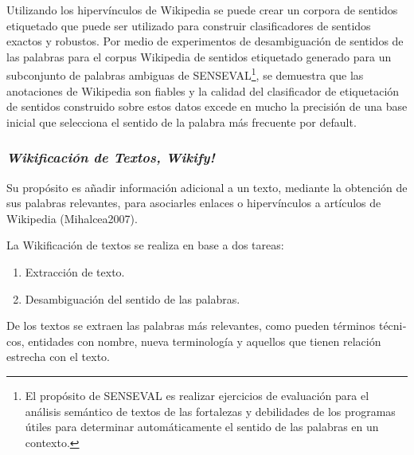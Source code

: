\documentclass[letterpaper]{article}
\newcommand\textstylebibuscitbase[1]{#1}
\newcommand\liststyleLxii{%
\renewcommand\theenumi{\arabic{enumi}}
\renewcommand\theenumii{\arabic{enumii}}
\renewcommand\theenumiii{\arabic{enumiii}}
\renewcommand\theenumiv{\arabic{enumiv}}
\renewcommand\labelenumi{\theenumi.}
\renewcommand\labelenumii{\theenumii.}
\renewcommand\labelenumiii{\theenumiii.}
\renewcommand\labelenumiv{\theenumiv.}
}
\begin{document}
\bigskip

{\sffamily
Utilizando \textstylebibuscitbase{los hiperv\'inculos de Wikipedia se
puede crear un corpora de sentidos etiquetado que puede ser utilizado
para construir clasificadores de sentidos
}\textstylebibuscitbase{exactos y robustos. Por medio de experimentos
de desambiguaci\'on de sentidos }\textstylebibuscitbase{de las palabras
para el corpus Wikipedia de sentidos etiquetado generado para un
subconjunto de palabras ambiguas de SENSEVAL}\footnote{El prop\'osito
de SENSEVAL es realizar ejercicios de evaluaci\'on para el an\'alisis
sem\'antico de textos de las fortalezas y debilidades de los programas
\'utiles para determinar autom\'aticamente el sentido de las palabras
en un contexto.}\textstylebibuscitbase{, se demuestra que las
anotaciones de Wikipedia son fiables}\textstylebibuscitbase{ y la
calidad del clasificador de etiquetaci\'on de sentidos construido sobre
estos datos excede en mucho la precisi\'on de una base inicial }%
\textstylebibuscitbase{que selecciona el sentido de la palabra m\'as
}\textstylebibuscitbase{frecuente por default.}}


\bigskip

\subsubsection[Wikificaci\'on de Textos,
Wikify!]{\sffamily\itshape Wikificaci\'on de
Textos, Wikify!}
{\sffamily
Su prop\'osito es a\~nadir informaci\'on adicional a un texto, mediante
la obtenci\'on de sus palabras relevantes, para asociarles enlaces o
hiperv\'inculos a art\'iculos de Wikipedia (Mihalcea2007).}

{\sffamily
La Wikificaci\'on de textos se realiza en base a dos tareas:}

\liststyleLxii
\begin{enumerate}
\item {\sffamily
Extracci\'on de texto.}
\item {\sffamily
Desambiguaci\'on del sentido de las palabras.}
\end{enumerate}

\bigskip

{\sffamily
\foreignlanguage{spanish}{De los textos se extraen las palabras m\'as
relevantes, como pueden t\'erminos t\'ecnicos, entidades con nombre,
nueva terminolog\'ia y aquellos que tie}nen relaci\'on estrecha con el
texto.}
\end{document}
